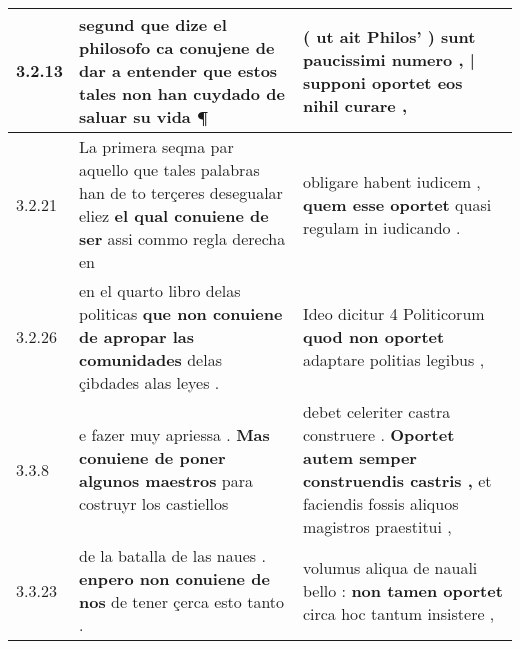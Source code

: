 \begin{tabular}{|p{1cm}|p{6.5cm}|p{6.5cm}|}
3.2.13 & segund que dize el philosofo \textbf{ ca conujene de dar a entender } que estos tales non han cuydado de saluar su vida ¶ & ( ut ait Philos’ ) \textbf{ sunt paucissimi numero , | supponi oportet } eos nihil curare , \\\hline
3.2.21 & La primera seqma par aquello que tales palabras han de to terçeres desegualar eliez \textbf{ el qual conuiene de ser } assi commo regla derecha en & obligare habent iudicem , \textbf{ quem esse oportet } quasi regulam in iudicando . \\\hline
3.2.26 & en el quarto libro delas politicas \textbf{ que non conuiene de apropar las comunidades } delas çibdades alas leyes . & Ideo dicitur 4 Politicorum \textbf{ quod non oportet } adaptare politias legibus , \\\hline
3.3.8 & e fazer muy apriessa . \textbf{ Mas conuiene de poner algunos maestros } para costruyr los castiellos & debet celeriter castra construere . \textbf{ Oportet autem semper construendis castris , } et faciendis fossis aliquos magistros praestitui , \\\hline
3.3.23 & de la batalla de las naues . \textbf{ enpero non conuiene de nos } de tener çerca esto tanto . & volumus aliqua de nauali bello : \textbf{ non tamen oportet } circa hoc tantum insistere , \\\hline

\end{tabular}

